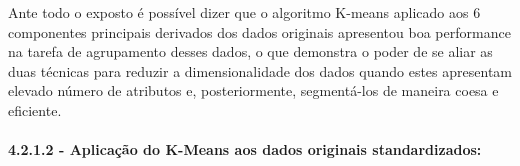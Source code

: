 \documentclass[
  letterpaper,
  DIV=11,
  numbers=noendperiod]{scrartcl}
\let\oldparagraph\paragraph
\renewcommand{\paragraph}[1]{\oldparagraph{#1}\mbox{}}
\begin{document}
Ante todo o exposto é possível dizer que o algoritmo K-means aplicado
aos 6 componentes principais derivados dos dados originais apresentou
boa performance na tarefa de agrupamento desses dados, o que demonstra o
poder de se aliar as duas técnicas para reduzir a dimensionalidade dos
dados quando estes apresentam elevado número de atributos e,
posteriormente, segmentá-los de maneira coesa e eficiente.

\paragraph{4.2.1.2 - Aplicação do K-Means aos dados originais
standardizados:}\label{aplicauxe7uxe3o-do-k-means-aos-dados-originais-standardizados}

\begingroup\fontsize{3.5}{5.5}\selectfont
\end{document}
